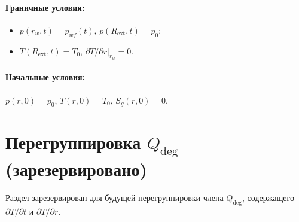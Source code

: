 \documentclass[12pt,a4paper]{article}
\begin{document}
\paragraph{Граничные условия:}
\begin{itemize}[nosep]
  \item $p(r_w,t) = p_{wf}(t)$, \quad $p(R_{\mathrm{ext}},t) = p_0$;
  \item $T(R_{\mathrm{ext}},t) = T_0$, \quad
        $\partial T/\partial r\big|_{r_w} = 0$.
\end{itemize}

\paragraph{Начальные условия:}
$p(r,0) = p_0$, \quad $T(r,0) = T_0$, \quad $S_g(r,0) = 0$.


\section*{Перегруппировка $Q_{\mathrm{deg}}$
  (зарезервировано)}\label{sec:regroup_deg}

Раздел зарезервирован для будущей перегруппировки члена
$Q_{\mathrm{deg}}$, содержащего $\partial T/\partial t$
и $\partial T/\partial r$.
\end{document}
